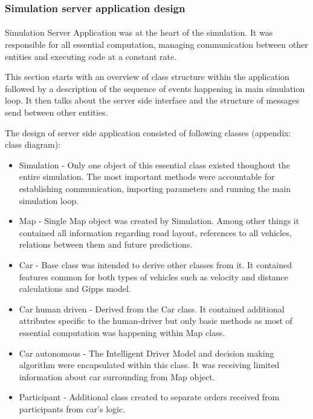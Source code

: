 \documentclass[11pt,english,twoside]{article}
\begin{document}
\subsubsection{Simulation server application design}
\paragraph{}

Simulation Server Application was at the heart of the simulation. It was responsible for all essential computation, managing communication between other entities and executing code at a constant rate.
\par
This section starts with an overview of class structure within the application followed by a description of the sequence of events happening in main simulation loop. It then talks about the server side interface and the structure of messages send between other entities.

\par

The design of server side application consisted of following classes (appendix: class diagram):

\begin{itemize}
\item Simulation - Only one object of this essential class existed thoughout the entire simulation. The most important methods were accountable for establishing communication, importing parameters and running the main simulation loop.
\item Map - Single Map object was created by Simulation. Among other things it contained all information regarding road layout, references to all vehicles, relations between them and future predictions. 
\item Car - Base class was intended to derive other classes from it. It contained features common for both types of vehicles such as velocity and distance calculations and Gipps model.
\item Car human driven - Derived from the Car class. It contained additional attributes specific to the human-driver but only basic methods as most of essential computation was happening within Map class.
\item Car autonomous - The Intelligent Driver Model and decision making algorithm were encapsulated within this class. It was receiving limited information about car surrounding from Map object.
\item Participant - Additional class created to separate orders received from participants from car's logic.
\end{itemize}
\end{document}
